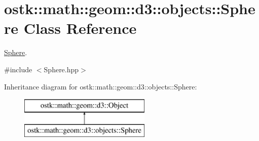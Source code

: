 \hypertarget{classostk_1_1math_1_1geom_1_1d3_1_1objects_1_1_sphere}{}\section{ostk\+:\+:math\+:\+:geom\+:\+:d3\+:\+:objects\+:\+:Sphere Class Reference}
\label{classostk_1_1math_1_1geom_1_1d3_1_1objects_1_1_sphere}


\hyperlink{classostk_1_1math_1_1geom_1_1d3_1_1objects_1_1_sphere}{Sphere}.  




{\ttfamily \#include $<$Sphere.\+hpp$>$}

Inheritance diagram for ostk\+:\+:math\+:\+:geom\+:\+:d3\+:\+:objects\+:\+:Sphere\+:\begin{figure}[H]
\begin{center}
\leavevmode
\includegraphics[height=2.000000cm]{classostk_1_1math_1_1geom_1_1d3_1_1objects_1_1_sphere}
\end{center}
\end{figure}

